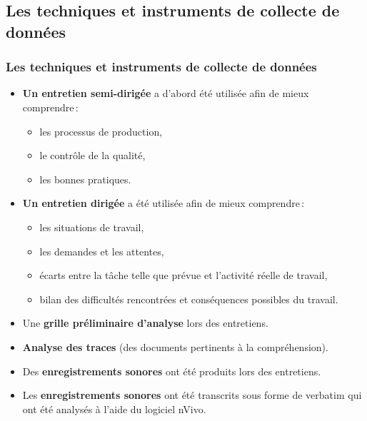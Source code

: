                        		 \subsection{Les techniques et instruments de collecte de données} 
					\begin{frame}[allowframebreaks]
						\frametitle{Les techniques et instruments de collecte de données}
                        
                        			\begin{itemize} 
                       				\item \textbf{Un entretien semi-dirigée} a d’abord été utilisée afin de mieux comprendre\,:
                       				\begin{itemize}
                       				 	\item les processus de production, 
                       				 	\item le contrôle de la qualité,
                       				 	\item les bonnes pratiques.
                       				 \end{itemize}
                       				\framebreak
                       				\item \textbf{Un entretien dirigée} a été utilisée afin de mieux comprendre\,:
                       				\begin{itemize}
                       					\item les situations de travail,
                       					\item les demandes et les attentes,
                       					\item écarts entre la tâche telle que prévue et l’activité réelle de travail,
                       					\item bilan des difficultés rencontrées et conséquences possibles du travail.
							\end{itemize}
							\item Une \textbf{grille préliminaire d’analyse} lors des entretiens.
							\item \textbf{Analyse des traces} (des documents pertinents à la compréhension).
							\item Des \textbf{enregistrements sonores} ont été produits lors des entretiens.
							\item Les \textbf{enregistrements sonores} ont été transcrits sous forme de verbatim qui ont été analysés à l’aide du logiciel nVivo.
                       		 	\end{itemize}
                       		           
                			\end{frame}
                
